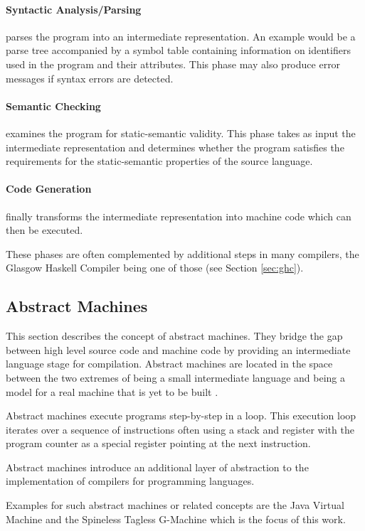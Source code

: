 \documentclass[runningheads]{llncs}
\begin{document}
\paragraph{Syntactic Analysis/Parsing} parses the program into an intermediate representation. An example would be a parse tree accompanied by a symbol table containing information on identifiers used in the program and their attributes. This phase may also produce error messages if syntax errors are detected.

\paragraph{Semantic Checking} examines the program for static-semantic validity. This phase takes as input the intermediate representation and determines whether the program satisfies the requirements for the static-semantic properties of the source language.

\paragraph{Code Generation} finally transforms the intermediate representation into machine code which can then be executed. 


These phases are often complemented by additional steps in many compilers, the Glasgow Haskell Compiler being one of those (see Section \ref{sec:ghc}).

\subsection{Abstract Machines}
This section describes the concept of abstract machines. They bridge the gap between high level source code and machine code by providing an intermediate language stage for compilation. Abstract machines are located in the space between the two extremes of being a small intermediate language and being a model for a real machine that is yet to be built \cite{diehl2000abstract}.

Abstract machines execute programs step-by-step in a loop. This execution loop iterates over a sequence of instructions often using a stack and register with the program counter as a special register pointing at the next instruction. \cite{diehl2000abstract}

Abstract machines introduce an additional layer of abstraction to the implementation of compilers for programming languages.

Examples for such abstract machines or related concepts are the Java Virtual Machine and the Spineless Tagless G-Machine which is the focus of this work.
\end{document}
